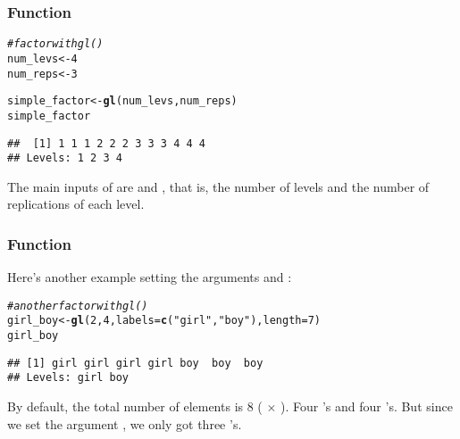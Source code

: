 \documentclass[12pt]{beamer}\usepackage[]{graphicx}\usepackage[]{color}
\makeatletter
\newcommand{\hlnum}[1]{\textcolor[rgb]{0.686,0.059,0.569}{#1}}%
\newcommand{\hlstr}[1]{\textcolor[rgb]{0.192,0.494,0.8}{#1}}%
\newcommand{\hlcom}[1]{\textcolor[rgb]{0.678,0.584,0.686}{\textit{#1}}}%
\newcommand{\hlstd}[1]{\textcolor[rgb]{0.345,0.345,0.345}{#1}}%
\newcommand{\hlkwb}[1]{\textcolor[rgb]{0.69,0.353,0.396}{#1}}%
\newcommand{\hlkwc}[1]{\textcolor[rgb]{0.333,0.667,0.333}{#1}}%
\newcommand{\hlkwd}[1]{\textcolor[rgb]{0.737,0.353,0.396}{\textbf{#1}}}%
\newenvironment{kframe}{%
 \def\at@end@of@kframe{}%
 \ifinner\ifhmode%
  \def\at@end@of@kframe{\end{minipage}}%
  \begin{minipage}{\columnwidth}%
 \fi\fi%
 \def\FrameCommand##1{\hskip\@totalleftmargin \hskip-\fboxsep
 \colorbox{shadecolor}{##1}\hskip-\fboxsep
     \hskip-\linewidth \hskip-\@totalleftmargin \hskip\columnwidth}%
 \MakeFramed {\advance\hsize-\width
   \@totalleftmargin\z@ \linewidth\hsize
   \@setminipage}}%
 {\par\unskip\endMakeFramed%
 \at@end@of@kframe}
\newenvironment{knitrout}{}{} %
\makeatother
\begin{document}
\begin{frame}[fragile]
\frametitle{Function }

\begin{knitrout}\footnotesize
{}\color{fgcolor}\begin{kframe}
\begin{alltt}
\hlcom{# factor with gl()}
\hlstd{num_levs} \hlkwb{<-} \hlnum{4}
\hlstd{num_reps} \hlkwb{<-} \hlnum{3}

\hlstd{simple_factor} \hlkwb{<-} \hlkwd{gl}\hlstd{(num_levs, num_reps)}
\hlstd{simple_factor}
\end{alltt}
\begin{verbatim}
##  [1] 1 1 1 2 2 2 3 3 3 4 4 4
## Levels: 1 2 3 4
\end{verbatim}
\end{kframe}
\end{knitrout}

The main inputs of  are  and , that is, the number of levels and the number of replications of each level.

\end{frame}


\begin{frame}[fragile]
\frametitle{Function }

Here's another example setting the arguments  and :
\begin{knitrout}\footnotesize
{}\color{fgcolor}\begin{kframe}
\begin{alltt}
\hlcom{# another factor with gl()}
\hlstd{girl_boy} \hlkwb{<-} \hlkwd{gl}\hlstd{(}\hlnum{2}\hlstd{,} \hlnum{4}\hlstd{,} \hlkwc{labels} \hlstd{=} \hlkwd{c}\hlstd{(}\hlstr{"girl"}\hlstd{,} \hlstr{"boy"}\hlstd{),} \hlkwc{length} \hlstd{=} \hlnum{7}\hlstd{)}
\hlstd{girl_boy}
\end{alltt}
\begin{verbatim}
## [1] girl girl girl girl boy  boy  boy 
## Levels: girl boy
\end{verbatim}
\end{kframe}
\end{knitrout}
By default, the total number of elements is 8 ( $\times$ ). Four 's and four 's. But since we set the argument , we only got three 's.

\end{frame}
\end{document}
